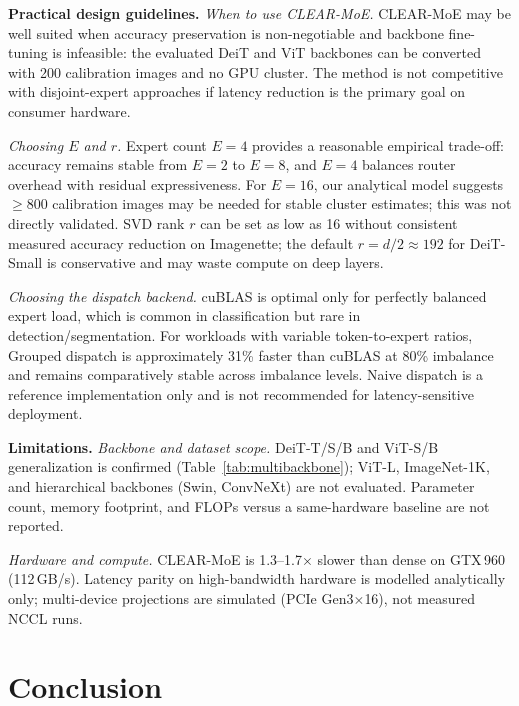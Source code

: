 \documentclass[conference]{IEEEtran}
\begin{document}
\textbf{Practical design guidelines.}
\emph{When to use CLEAR-MoE.} CLEAR-MoE may be well suited when accuracy preservation is non-negotiable and backbone fine-tuning is infeasible: the evaluated DeiT and ViT backbones can be converted with 200 calibration images and no GPU cluster. The method is not competitive with disjoint-expert approaches if latency reduction is the primary goal on consumer hardware.

\emph{Choosing $E$ and $r$.} Expert count $E{=}4$ provides a reasonable empirical trade-off: accuracy remains stable from $E{=}2$ to $E{=}8$, and $E{=}4$ balances router overhead with residual expressiveness. For $E{=}16$, our analytical model suggests $\geq$800 calibration images may be needed for stable cluster estimates; this was not directly validated. SVD rank $r$ can be set as low as 16 without consistent measured accuracy reduction on Imagenette; the default $r{=}d/2{\approx}192$ for DeiT-Small is conservative and may waste compute on deep layers.

\emph{Choosing the dispatch backend.} cuBLAS is optimal only for perfectly balanced expert load, which is common in classification but rare in detection/segmentation. For workloads with variable token-to-expert ratios, Grouped dispatch is approximately 31\% faster than cuBLAS at 80\% imbalance and remains comparatively stable across imbalance levels. Naive dispatch is a reference implementation only and is not recommended for latency-sensitive deployment.

\textbf{Limitations.}
\emph{Backbone and dataset scope.} DeiT-T/S/B and ViT-S/B generalization is confirmed (Table~\ref{tab:multibackbone}); ViT-L, ImageNet-1K, and hierarchical backbones (Swin, ConvNeXt) are not evaluated. Parameter count, memory footprint, and FLOPs versus a same-hardware baseline are not reported.

\emph{Hardware and compute.} CLEAR-MoE is 1.3--1.7$\times$ slower than dense on GTX\,960 (112\,GB/s). Latency parity on high-bandwidth hardware is modelled analytically only; multi-device projections are simulated (PCIe Gen3$\times$16), not measured NCCL runs.

\section{Conclusion}
\label{sec:conclusion}
\end{document}
